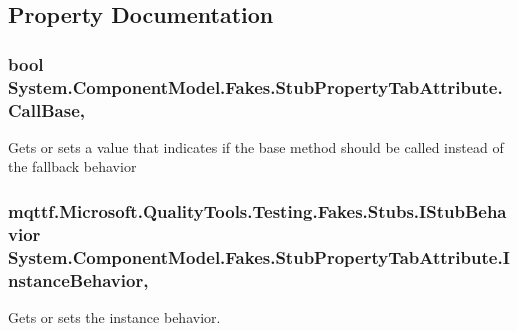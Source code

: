 \subsection{Property Documentation}
\hypertarget{class_system_1_1_component_model_1_1_fakes_1_1_stub_property_tab_attribute_aff7cc36b3da46dc77894241cb1e277cc}{
\subsubsection[{Call\-Base}]{\setlength{\rightskip}{0pt plus 5cm}bool System.\-Component\-Model.\-Fakes.\-Stub\-Property\-Tab\-Attribute.\-Call\-Base\hspace{0.3cm}{\ttfamily [get]}, {\ttfamily [set]}}}\label{class_system_1_1_component_model_1_1_fakes_1_1_stub_property_tab_attribute_aff7cc36b3da46dc77894241cb1e277cc}


Gets or sets a value that indicates if the base method should be called instead of the fallback behavior

\hypertarget{class_system_1_1_component_model_1_1_fakes_1_1_stub_property_tab_attribute_a1c093ef73d30f77eb91af3ddf3f4c9d7}{
\subsubsection[{Instance\-Behavior}]{\setlength{\rightskip}{0pt plus 5cm}mqttf.\-Microsoft.\-Quality\-Tools.\-Testing.\-Fakes.\-Stubs.\-I\-Stub\-Behavior System.\-Component\-Model.\-Fakes.\-Stub\-Property\-Tab\-Attribute.\-Instance\-Behavior\hspace{0.3cm}{\ttfamily [get]}, {\ttfamily [set]}}}\label{class_system_1_1_component_model_1_1_fakes_1_1_stub_property_tab_attribute_a1c093ef73d30f77eb91af3ddf3f4c9d7}


Gets or sets the instance behavior.

